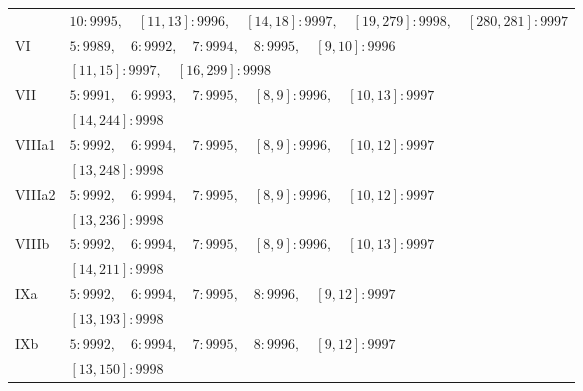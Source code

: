 \begin{longtable}{@{}lp{}@{}}
 & $10:9995,\quad [11,13]:9996,\quad [14,18]:9997,\quad [19,279]:9998,\quad [280,281]:9997$\\
VI & $5:9989,\quad 6:9992,\quad 7:9994,\quad 8:9995,\quad [9,10]:9996$\\
 & $[11,15]:9997,\quad [16,299]:9998$\\
VII & $5:9991,\quad 6:9993,\quad 7:9995,\quad [8,9]:9996,\quad [10,13]:9997$\\
 & $[14,244]:9998$\\
VIIIa1 & $5:9992,\quad 6:9994,\quad 7:9995,\quad [8,9]:9996,\quad [10,12]:9997$\\
 & $[13,248]:9998$\\
VIIIa2 & $5:9992,\quad 6:9994,\quad 7:9995,\quad [8,9]:9996,\quad [10,12]:9997$\\
 & $[13,236]:9998$\\
VIIIb & $5:9992,\quad 6:9994,\quad 7:9995,\quad [8,9]:9996,\quad [10,13]:9997$\\
 & $[14,211]:9998$\\
IXa & $5:9992,\quad 6:9994,\quad 7:9995,\quad 8:9996,\quad [9,12]:9997$\\
 & $[13,193]:9998$\\
IXb & $5:9992,\quad 6:9994,\quad 7:9995,\quad 8:9996,\quad [9,12]:9997$\\
 & $[13,150]:9998$\\
\bottomrule\end{longtable}

